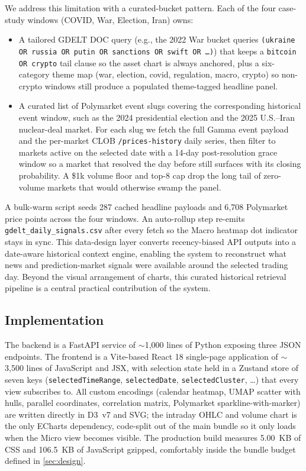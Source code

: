 \documentclass[journal,hideappendix]{vgtc}      %
\begin{document}
We address this limitation with a curated-bucket pattern. 
Each of the four case-study windows (COVID, War, Election, Iran) owns:

\begin{itemize}
  \item A tailored GDELT DOC query (e.g., the 2022 War bucket queries
    \texttt{(ukraine OR russia OR putin OR sanctions OR swift OR \ldots)})
    that keeps a \texttt{bitcoin OR crypto} tail clause so the asset
    chart is always anchored, plus a six-category theme map (war,
    election, covid, regulation, macro, crypto) so non-crypto windows
    still produce a populated theme-tagged headline panel.
  \item A curated list of Polymarket event slugs covering the corresponding historical event window, such as the 2024 presidential election and the 2025 U.S.--Iran nuclear-deal market. 
  For each slug we fetch the full Gamma event payload and the per-market CLOB \texttt{/prices-history} daily series, then filter to markets active on the selected date with a 14-day post-resolution grace window so a market that resolved the day before still surfaces with its closing probability.  A \$1k volume floor and top-8 cap drop the long tail of zero-volume markets that would otherwise swamp the panel.
\end{itemize}

A bulk-warm script seeds 287 cached headline payloads and 6{,}708
Polymarket price points across the four windows.  An auto-rollup step
re-emits \texttt{gdelt\_daily\_signals.csv} after every fetch so the
Macro heatmap dot indicator stays in sync.  
This data-design layer converts recency-biased API outputs into a date-aware historical context engine, enabling the system to reconstruct what news and prediction-market signals were available around the selected trading day. 
Beyond the visual arrangement of charts, this curated historical retrieval pipeline is a central practical contribution of the system.

\subsection{Implementation}
\label{sec:impl}

The backend is a FastAPI service of $\sim$1{,}000 lines of Python
exposing three JSON endpoints.  
The frontend is a Vite-based React 18 single-page application of \(\sim\)3{,}500 lines of JavaScript and JSX, with selection state held in a Zustand store of seven keys (\texttt{selectedTimeRange}, \texttt{selectedDate}, \texttt{selectedCluster}, \ldots) that every view subscribes to.  
All custom encodings (calendar heatmap, UMAP scatter with hulls, parallel coordinates, correlation matrix, Polymarket sparkline-with-marker) are written directly in D3~v7 and SVG; the intraday OHLC and volume chart is the only ECharts dependency, code-split out of the main bundle so it only loads when the Micro view becomes visible.  
The production build measures 5.00~KB of CSS and 106.5~KB of JavaScript gzipped, comfortably inside the bundle budget defined in
\cref{sec:design}.
\end{document}
